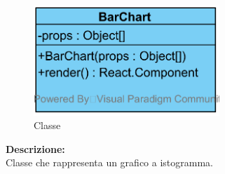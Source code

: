 %
%
%
%
%

\paragraph[::BarChart]{\class}\mbox{}\\ \label{\class}
\begin{figure}[H]
	\centering
	\includegraphics[width=7cm]{./diagrammi/framework/view/gui/barchart.png}
	\caption{Classe \class}
\end{figure}
\textbf{Descrizione:}\\
Classe che rappresenta un grafico a istogramma.


